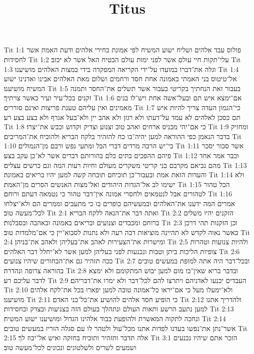 

\title{Titus}

Tit 1:1  פולוס עבד אלהים ושליח ישוע המשיח לפי אמונת בחירי אלהים ודעת האמת אשר לחסידות׃
Tit 1:2  עלי־תקות חיי עולם אשר לפני ימות עולם הבטיח האל אשר לא יכזב׃
Tit 1:3  וגלה את־דברו במועדו על־ידי הקריאה המפקדה בידי במצות האלהים מושיענו׃
Tit 1:4  אל־טיטוס בני האמתי באמונה אחת חסד ורחמים ושלום מאת האלהים אבינו ואדנינו ישוע המשיח מושיענו׃
Tit 1:5  בעבור זאת הנחתיך בקריטי בעבור אשר תשלים את־החסר ותמנה זקנים בכל־עיר ועיר כאשר צויתיך׃
Tit 1:6  אם־ימצא איש תם ובעל־אשה אחת ויש־לו בנים מאמינים ואין עליהם טענת פריצות ואינם סוררים׃
Tit 1:7  כי־הגמון העדה צריך להיות איש תם כסכן לאלהים לא עמד על־דעתו ולא רגזן ולא אהב יין ולא־בעל אגרף ולא בצע בצע רע׃
Tit 1:8  כי אם־יהי מכניס ארחים ואהב טוב וצנוע וצדיק וקדוש וכבש את־יצרו׃
Tit 1:9  ומחזיק בדבר הנאמן כפי ההוראה למען יהיה־בו כח להזהיר בלקח הבריא ולהוכיח את־המריבים׃
Tit 1:10  כי־יש הרבה מרדים דברי הבל ומתעי נפש ורבם מן־הנמולים׃
Tit 1:11  אשר סכור יסכר פיהם ההפכים בתים כלם בהורותם דברים אשר לא־כן עקב בצע׃
Tit 1:12  וכבר אמר אחד מהם נביאם מקרבם בני קריטי משקרים מעולם וחיות רעות המה וגם כרשים עצלים׃
Tit 1:13  והעדות הזאת אמת ובעבור־כן תוכיחם תוכחה קשה למען יהיו בריאים באמונה׃
Tit 1:14  ולא ישימו לב אל־הגדות היהודים ואל־מצות האנשים הסרים מן־האמת׃
Tit 1:15  הכל טהור לטהורים אבל לנטמאים ולחסרי אמונה אין־דבר טהור כי נטמאה דעתם ורוחם׃
Tit 1:16  אמרים המה ידענו את־האלהים ובמעשיהם כופרים בו כי מתעבים וממרים הם ולא־יצלחו לכל־מעשה טוב׃
Tit 2:1  ואתה דבר את־הנאה ללקח הבריא׃
Tit 2:2  הזקנים יהיו משלים ברוחם ומכבדים וצנועים ובריאים באמונה ובאהבה ובסבלנות׃
Tit 2:3  וכן הזקנות תהי דרכן כאשר נאוה לקדש לא תהיינה מוציאות דבה רעה ולא נתנות לסבוא־יין כי אם־מלמדות טוב׃
Tit 2:4  ומישרות את־הצעירות לאהב את־בעליהן ולאהב את־בניהן׃
Tit 2:5  ולהיות צנועות וטהרות צופיות הליכות ביתן וטבות ונכנעות לפני בעליהן למען אשר לא־יחלל דבר האלהים׃
Tit 2:6  ככה תזהיר גם את־הבחורים שיהיו צנועים׃
Tit 2:7  ובכל־דבר היה אתה למופת במעשים טובים בהוראה צרופה ונהדרה׃
Tit 2:8  ובדבר בריא שאין־בו מום למען יבוש המתקומם ולא ימצא לדבר עליכם רע׃
Tit 2:9  העבדים יכנעו לאדניהם ויתרצו להם לכל־דבר ולא ימרו את־דבריהם׃
Tit 2:10  ולא־ימעלו מעל כי אם־יראו כל־אמונה טובה למען יפארו בכל את־לקח אלהים מושיענו׃
Tit 2:11  כי הופיע חסד אלהים להושיע את־כל־בני האדם׃
Tit 2:12  ולהדריך אתנו למען נתעב הרשע ותאות העולם ונתהלך בעולם הזה בצניעות ובצדק ובחסידות׃
Tit 2:13  ונחכה לתקוה המאשרת ולהופעת כבוד אלהינו הגדול ומושיענו ישוע המשיח׃
Tit 2:14  אשר־נתן את־נפשו בעדנו לפדות אתנו מכל־עול ולטהר לו עם סגלה הזריז במעשים טובים׃
Tit 2:15  אלה תדבר ותזהיר ותוכיח בחזקה ואיש אל־יבוז לך׃
Tit 3:1  הזכר אתם שיהיו נכנעים ושמעים לשרים ולשלטונים ונכונים לכל־מעשה טוב׃
